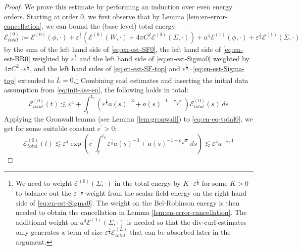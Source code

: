 \documentclass[11pt,leqno,textwidth=10cm]{amsart}
\numberwithin{equation}{section}
\theoremstyle{definition}
\theoremstyle{plain}
\newcommand{\1}{\mathbbm{1}}
\newcommand{\E}{\mathcal{E}}
\renewcommand{\epsilon}{\varepsilon}
\newcommand{\change}[1]{\color{black}#1\color{black}}
\begin{document}
\change{
\begin{proof}
We prove this estimate by performing an induction over even energy orders. Starting at order $0$, we first observe that by Lemma \ref{lem:en-error-cancellation}, we can bound the (base level) total energy
\[\E^{(0)}_{total}:=\E^{(0)}(\phi,\cdot)+\epsilon^\frac14\left(\E^{(0)}(W,\cdot)+4\pi C^2\E^{(0)}(\Sigma,\cdot)\right)+a^4\E^{(1)}(\phi,\cdot)+\epsilon^\frac12\E^{(1)}(\Sigma,\cdot)\]
by the sum of the left hand side of \eqref{eq:en-est-SF0}, the left hand side of \eqref{eq:en-est-BR0} weighted by $\epsilon^\frac14$ and the left hand side of \eqref{eq:en-est-Sigma0} weighted by $4\pi C^2\cdot\epsilon^\frac14$, and the left hand sides of \eqref{eq:en-est-SF-top} and $\epsilon^\frac12\cdot$\eqref{eq:en-est-Sigma-top} extended to $L=0$.\footnote{We need to weight $\E^{(0)}(\Sigma,\cdot)$ in the total energy by $K\cdot\epsilon^\frac14$ for some $K>0$ to balance out the $\epsilon^{-\frac18}$-weight from the scalar field energy on the right hand side of \eqref{eq:en-est-Sigma0}. The weight on the Bel-Robinson energy is then needed to obtain the cancellation in Lemma \ref{lem:en-error-cancellation}\change{. The additional weight on $a^4\E^{(1)}(\Sigma,\cdot)$ is needed so that the div-curl-estimates only generates a term of size $\epsilon^\frac14\E^{(L)}_{total}$ that can be absorbed later in the argument.}} Combining said estimates and inserting the initial data assumption from \eqref{eq:init-ass-en}, the following holds in total:
\begin{equation}\label{eq:en-eq-total0}
\E^{(0)}_{total}(t)\lesssim\epsilon^4+\int_t^{t_0}\left(\epsilon^\frac18a(s)^{-3}+a(s)^{-1-c\sqrt{\epsilon}}\right)\E^{(0)}_{total}(s)\,ds
\end{equation}
Applying the Gronwall lemma (see Lemma \ref{lem:gronwall}) to \eqref{eq:en-eq-total0}, we get for some suitable constant $c^\prime>0$:
\begin{equation*}\label{eq:en-bs-imp-base}
\E^{(0)}_{total}(t)\lesssim \epsilon^4\exp\left(c^\prime\int_t^{t_0}\epsilon^\frac18 a(s)^{-3}+a(s)^{-1-c\sqrt{\epsilon}}\,ds\right)\lesssim \epsilon^4a^{-c^\prime\epsilon^\frac18}
\end{equation*}

\end{proof}}
\end{document}
